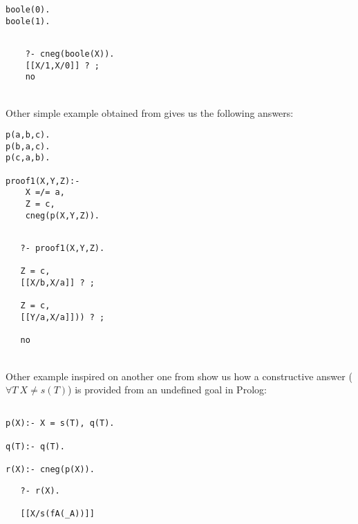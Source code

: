 \documentclass{llncs}
\begin{document}
\begin{minipage}{2in}
\begin{verbatim}
boole(0).
boole(1).
\end{verbatim}
\end{minipage}
\begin{minipage}{2in}
\begin{verbatim} 

    ?- cneg(boole(X)).
    [[X/1,X/0]] ? ;
    no
\end{verbatim} 
\end{minipage}\\

Other simple example obtained from \cite{Stuckey95} gives us the
following answers:

\begin{minipage}{2in}
\begin{verbatim}
p(a,b,c).
p(b,a,c).
p(c,a,b).

proof1(X,Y,Z):-
    X =/= a,
    Z = c,
    cneg(p(X,Y,Z)).
\end{verbatim}
\end{minipage}
\begin{minipage}{2in}
\begin{verbatim} 

   ?- proof1(X,Y,Z).

   Z = c,
   [[X/b,X/a]] ? ;

   Z = c,
   [[Y/a,X/a]])) ? ;

   no
\end{verbatim} 
\end{minipage}\\

Other example inspired on another one from \cite{Stuckey95} show us
how a constructive answer ($\forall T ~ X \neq s(T)$) is provided from
an undefined goal in Prolog:

\begin{minipage}{2in}
\begin{verbatim}

p(X):- X = s(T), q(T).

q(T):- q(T).

r(X):- cneg(p(X)).
\end{verbatim}
\end{minipage}
\begin{minipage}{2in}
\begin{verbatim} 
   ?- r(X).

   [[X/s(fA(_A))]]

\end{verbatim} 
\end{minipage}\\
\end{document}
